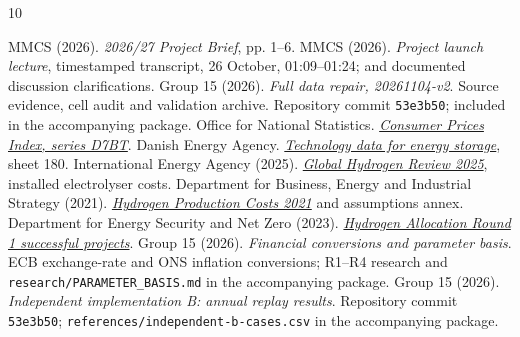 \begin{thebibliography}{10}
\small\setlength{\itemsep}{3pt}\setlength{\parskip}{0pt}
 MMCS (2026). \emph{2026/27 Project Brief}, pp. 1--6.
 MMCS (2026). \emph{Project launch lecture}, timestamped
transcript, 26 October, 01:09--01:24; and documented discussion clarifications.
 Group 15 (2026). \emph{Full data repair, 20261104-v2}.
Source evidence, cell audit and validation archive. Repository commit
\texttt{53e3b50}; included in the accompanying package.
 Office for National Statistics.
\href{https://www.ons.gov.uk/economy/inflationandpriceindices/timeseries/d7bt/mm23}
{\emph{Consumer Prices Index, series D7BT}}.
 Danish Energy Agency.
\href{https://ens.dk/media/6589/download}{\emph{Technology data for energy storage}},
sheet 180.
 International Energy Agency (2025).
\href{https://www.iea.org/reports/global-hydrogen-review-2025/executive-summary}
{\emph{Global Hydrogen Review 2025}}, installed electrolyser costs.
 Department for Business, Energy and Industrial Strategy (2021).
\href{https://assets.publishing.service.gov.uk/media/611b710e8fa8f53dc994e59d/Hydrogen_Production_Costs_2021.pdf}
{\emph{Hydrogen Production Costs 2021}} and assumptions annex.
 Department for Energy Security and Net Zero (2023).
\href{https://www.gov.uk/government/publications/hydrogen-production-business-model-net-zero-hydrogen-fund-shortlisted-projects/hydrogen-production-business-model-net-zero-hydrogen-fund-har1-successful-projects}
{\emph{Hydrogen Allocation Round 1 successful projects}}.
 Group 15 (2026). \emph{Financial conversions and parameter basis}.
ECB exchange-rate and ONS inflation conversions; R1--R4 research and
\texttt{research/PARAMETER\_BASIS.md} in the accompanying package.
 Group 15 (2026). \emph{Independent implementation B: annual
replay results}. Repository commit \texttt{53e3b50};
\texttt{references/independent-b-cases.csv} in the accompanying package.
\end{thebibliography}
